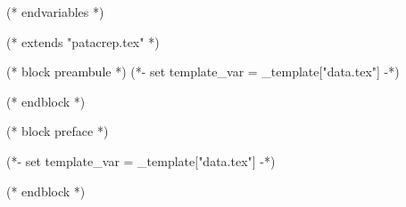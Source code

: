 (* endvariables *)

(* extends "patacrep.tex" *)

(* block preambule *)
(*- set template_var = _template["data.tex"] -*)
\usepackage{licence}

\makeatletter
\renewcommand{\chorusfont}{%
   (* for letter in template_var.chorusfont *)
   (* if letter=="i" *)   \it %
   (* elif letter=='b' *)   \bf %
   (* elif letter=='n' *)   \normalfont %
   (* endif *)
   (* endfor *)
}

\def\@chordfont{%
   (* for letter in template_var.chordfont *)
   (* if letter=="i" *)   \it %
   (* elif letter=='b' *)   \bf %
   (* elif letter=='n' *)   \normalfont %
   (* endif *)
   (* endfor *)
}
\renewcommand{\printchord}[1]{\@chordfont\textcolor{ChordColor}{#1}}

\renewcommand{\lyricfont}{%
   (* for letter in template_var.versefont *)
   (* if letter=="i" *)   \it %
   (* elif letter=='b' *)   \bf %
   (* elif letter=='n' *)   \normalfont %
   (* endif *)
   (* endfor *)
}
\makeatother

\geometry{
 ((template_var.geometry))
}

\let\OldSongColumns=\songcolumns
\def\songcolumns#1{%
(* if template_var.column_adjustment=="only_one" *)
    \OldSongColumns{1}
(* elif template_var.column_adjustment=="one_more" *)
    \count0=#1\relax\advance\count0 by 1\relax%
    \OldSongColumns{\count0}
(* else *)
    \OldSongColumns{#1}
(* endif *)
}

\renewcommand\colbotglue{0pt plus 1fill minus 0pt}

(* endblock *)

(* block preface *)
\newpage

\newpage

(*- set template_var = _template["data.tex"] -*)
\renewcommand{\songlistname}{((template_var.names.songlist))}
\renewcommand{\originalsongname}{((template_var.names.originalsong))}
\renewcommand{\introname}{((template_var.names.intro))}
\renewcommand{\outroname}{((template_var.names.outro))}
\renewcommand{\bridgename}{((template_var.names.bridge))}
\renewcommand{\chorusname}{((template_var.names.chorus))}
\renewcommand{\versename}{((template_var.names.verse))}
\renewcommand{\soloname}{((template_var.names.solo))}
\renewcommand{\patternname}{((template_var.names.pattern))}
\renewcommand{\rythmname}{((template_var.names.rythm))}
\renewcommand{\transpositionname}{((template_var.names.transposition))}
\renewcommand{\songindexname}{((template_var.names.songindex))}
\renewcommand{\authorindexname}{((template_var.names.authorindex))}
\renewcommand{\chordlistname}{((template_var.names.chordlist))}

\renewcommand{\guitarchordsname}{((template_var.names.guitarchords))}
\renewcommand{\ukulelechordsname}{((template_var.names.ukulelechords))}

(* endblock *)
